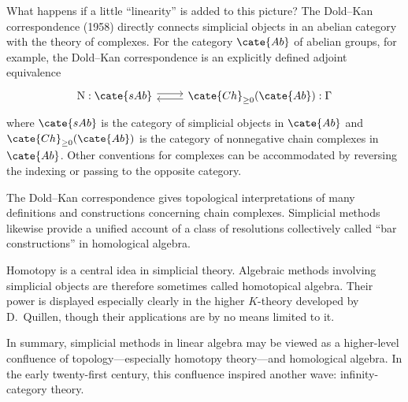 What happens if a little ``linearity'' is added to this picture? The Dold--Kan correspondence (1958) directly connects simplicial objects in an abelian category with the theory of complexes. For the category $\cate{Ab}$ of abelian groups, for example, the Dold--Kan correspondence is an explicitly defined adjoint equivalence
\[\begin{tikzcd}
	\mathrm{N}: \cate{sAb} \arrow[shift left, r] & \cate{Ch}_{\geq 0}(\cate{Ab}): \Gamma \arrow[shift left, l]
\end{tikzcd}\]
where $\cate{sAb}$ is the category of simplicial objects in $\cate{Ab}$ and $\cate{Ch}_{\geq0}(\cate{Ab})$ is the category of nonnegative chain complexes in $\cate{Ab}$. Other conventions for complexes can be accommodated by reversing the indexing or passing to the opposite category.

The Dold--Kan correspondence gives topological interpretations of many definitions and constructions concerning chain complexes. Simplicial methods likewise provide a unified account of a class of resolutions collectively called ``bar constructions'' in homological algebra.

Homotopy is a central idea in simplicial theory. Algebraic methods involving simplicial objects are therefore sometimes called homotopical algebra. Their power is displayed especially clearly in the higher $K$-theory developed by D.\ Quillen, though their applications are by no means limited to it.

In summary, simplicial methods in linear algebra may be viewed as a higher-level confluence of topology---especially homotopy theory---and homological algebra. In the early twenty-first century, this confluence inspired another wave: infinity-category theory.
